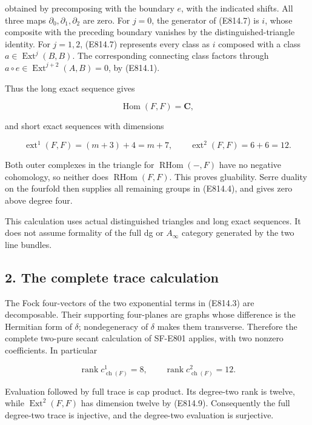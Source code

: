 obtained by precomposing with the boundary \(e\), with the indicated
shifts. All three maps \(\partial_0,\partial_1,\partial_2\) are zero.
For \(j=0\), the generator of (E814.7) is \(i\), whose composite with
the preceding boundary vanishes by the distinguished-triangle identity.
For \(j=1,2\), (E814.7) represents every class as \(i\) composed with a
class \(a\in\operatorname{Ext}^j(B,B)\). The corresponding connecting
class factors through \(a\circ e\in\operatorname{Ext}^{j+2}(A,B)=0\), by
(E814.1).

Thus the long exact sequence gives

\[
 \operatorname{Hom}(F,F)=\mathbf C,
\]

and short exact sequences with dimensions

\[
 \operatorname{ext}^1(F,F)=(m+3)+4=m+7,
 \qquad
 \operatorname{ext}^2(F,F)=6+6=12.
 \tag{E814.9}
\]

Both outer complexes in the triangle for \(\operatorname{RHom}(-,F)\)
have no negative cohomology, so neither does
\(\operatorname{RHom}(F,F)\). This proves gluability. Serre duality on
the fourfold then supplies all remaining groups in (E814.4), and gives
zero above degree four.

This calculation uses actual distinguished triangles and long exact
sequences. It does not assume formality of the full dg or \(A_\infty\)
category generated by the two line bundles.

\subsection{2. The complete trace
calculation}\label{SF-E814-the-complete-trace-calculation}

The Fock four-vectors of the two exponential terms in (E814.3) are
decomposable. Their supporting four-planes are graphs whose difference
is the Hermitian form of \(\delta\); nondegeneracy of \(\delta\) makes
them transverse. Therefore the complete two-pure secant calculation of
SF-E801 applies, with two nonzero coefficients. In particular

\[
 \operatorname{rank}c^1_{\operatorname{ch}(F)}=8,
 \qquad
 \operatorname{rank}c^2_{\operatorname{ch}(F)}=12.
 \tag{E814.10}
\]

Evaluation followed by full trace is cap product. Its degree-two rank is
twelve, while \(\operatorname{Ext}^2(F,F)\) has dimension twelve by
(E814.9). Consequently the full degree-two trace is injective, and the
degree-two evaluation is surjective.

